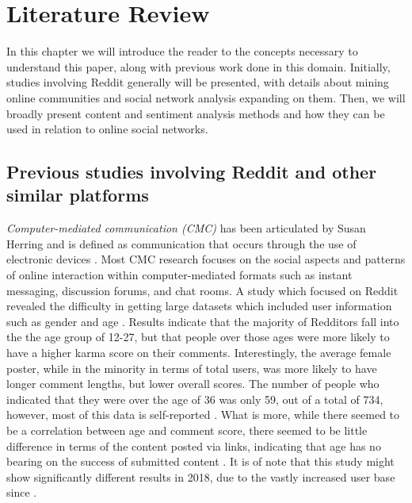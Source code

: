 \documentclass[bsc,frontabs,twoside,singlespacing,parskip,deptreport]{infthesis}
\begin{document}
\chapter{Literature Review}\label{background}
In this chapter we will introduce the reader to the concepts necessary to understand this paper, along with previous work done in this domain. Initially, studies involving Reddit generally will be presented, with details about mining online communities and social network analysis expanding on them. Then, we will broadly present content and sentiment analysis methods and how they can be used in relation to online social networks.

\section{Previous studies involving Reddit and other similar platforms}\label{previous-studies}

\textit{Computer-mediated communication (CMC)} has been articulated by Susan Herring and is defined as communication that occurs through the use of electronic devices \cite{HerringSusanC2004STtO}. Most CMC research focuses on the social aspects  and patterns of online interaction within computer-mediated formats such as instant messaging, discussion forums, and chat rooms. A study which focused on Reddit revealed the difficulty in getting large datasets which included user information such as gender and age \cite{FinlayS.Craig2014AaGi}. Results indicate that the majority of Redditors fall into the the age group of 12-27, but that people over those ages were more likely to have a higher karma score on their comments. Interestingly, the average female poster, while in the minority in terms of total users, was more likely to have longer comment lengths, but lower overall scores. The number of people who indicated that they were over the age of 36 was only 59, out of a total of 734, however, most of this data is self-reported \cite{FinlayS.Craig2014AaGi}. What is more, while there seemed to be a correlation between age and comment score, there seemed to be little difference in terms of the content posted via links, indicating that age has no bearing on the success of submitted content \cite{FinlayS.Craig2014AaGi}. It is of note that this study might show significantly different results in 2018, due to the vastly increased user base since \cite{alexa} \cite{statista}.
\end{document}
